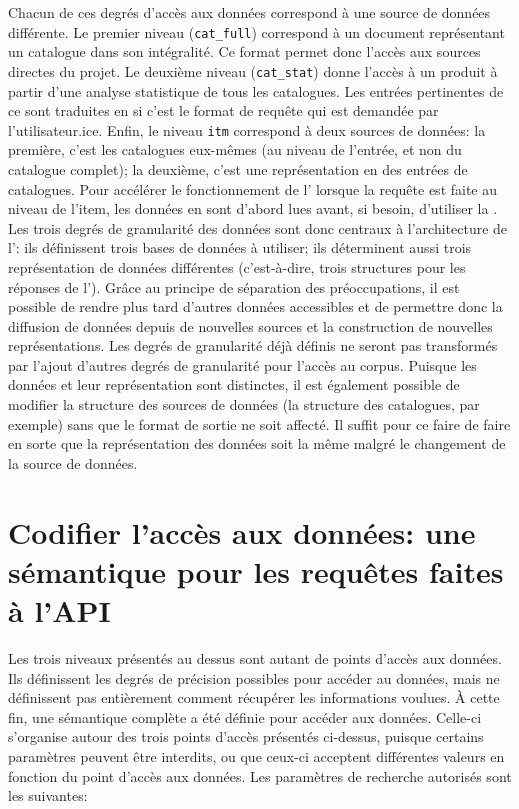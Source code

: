 Chacun de ces degrés d'accès aux données correspond à une source de données différente. Le premier niveau (\texttt{cat\_full}) correspond à un document \tei{} représentant un catalogue dans son intégralité. Ce format permet donc l'accès aux sources directes du projet. Le deuxième niveau (\texttt{cat\_stat}) donne l'accès à un \json{} produit à partir d'une analyse statistique de tous les catalogues. Les entrées pertinentes de ce \json{} sont traduites en \xmltei{} si c'est le format de requête qui est demandée par l'utilisateur.ice. Enfin, le niveau \texttt{itm} correspond à deux sources de données: la première, c'est les catalogues eux-mêmes (au niveau de l'entrée, et non du catalogue complet); la deuxième, c'est une représentation en \json{} des entrées de catalogues. Pour accélérer le fonctionnement de l'\api{} lorsque la requête est faite au niveau de l'item, les données en \json{} sont d'abord lues avant, si besoin, d'utiliser la \tei{}. Les trois degrés de granularité des données sont donc centraux à l'architecture de l'\api{}: ils définissent trois bases de données à utiliser; ils déterminent aussi trois représentation de données différentes (c'est-à-dire, trois structures pour les réponses de l'\api{}). Grâce au principe de séparation des préoccupations, il est possible de rendre plus tard d'autres données accessibles et de permettre donc la diffusion de données depuis de nouvelles sources et la construction de nouvelles représentations. Les degrés de granularité déjà définis ne seront pas transformés par l'ajout d'autres degrés de granularité pour l'accès au corpus. Puisque les données et leur représentation sont distinctes, il est également possible de modifier la structure des sources de données (la structure des catalogues, par exemple) sans que le format de sortie ne soit affecté. Il suffit pour ce faire de faire en sorte que la représentation des données soit la même malgré le changement de la source de données.

\section{Codifier l'accès aux données: une sémantique pour les requêtes faites à l'API}
Les trois niveaux présentés au dessus sont autant de points d'accès aux données. Ils définissent les degrés de précision possibles pour accéder au données, mais ne définissent pas entièrement comment récupérer les informations voulues. À cette fin, une sémantique complète a été définie pour accéder aux données. Celle-ci s'organise autour des trois points d'accès présentés ci-dessus, puisque certains paramètres peuvent être interdits, ou que ceux-ci acceptent différentes valeurs en fonction du point d'accès aux données. Les paramètres de recherche autorisés sont les suivantes:

